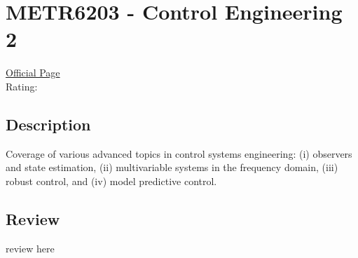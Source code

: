 \hypertarget{METR6203}{\section{METR6203 - Control Engineering 2}}

\large
\textcolor{turbo_purple}{\href{https://my.uq.edu.au/programs-courses/course.html?course_code=METR6203}{Official Page}} \\
Rating: \cstar\cstar\cstar\cstar\ostar

\normalsize
\subsection*{Description}
Coverage of various advanced topics in control systems engineering: (i) observers and state estimation, (ii) multivariable systems in the frequency domain, (iii) robust control, and (iv) model predictive control.

\subsection*{Review}
review here
